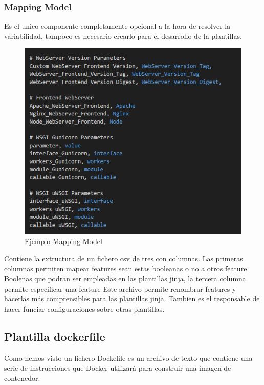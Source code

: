 \documentclass[12pt, a4paper, twoside]{article}
\begin{document}
\newpage
\subsubsection{Mapping Model}
\label{sec:Mapping Model}
Es el unico componente completamente opcional a la hora de resolver la variabilidad, tampoco es necesario crearlo para el desarrollo de la plantillas.

\begin{figure}[h]
	\centering
		\includegraphics[width=1\textwidth]{mapping_model_screenshot.png}
	\caption{Ejemplo Mapping Model}
\end{figure}

Contiene la extructura de un fichero csv de tres con columnas. Las primeras columnas permiten mapear features sean estas booleanas o no a otros feature Boolenas que podran ser empleadas en las plantillas jinja, la tercera columna permite especificar una feature
Este archivo permite renombrar features y hacerlas más comprensibles para las plantillas jinja. Tambien es el responsable de hacer funciar configuraciones sobre otras plantillas.

\newpage
\subsection{Plantilla dockerfile}
\label{sec:Plantilla dockerfile}
Como hemos visto un fichero Dockefile es un archivo de texto que contiene una serie de instrucciones que Docker \cite{docker} utilizará para construir una imagen de contenedor.
\end{document}
